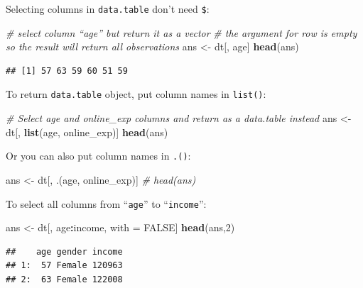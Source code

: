\documentclass[12pt,]{krantz}
\makeatletter
\newenvironment{Shaded}{\begin{snugshade}}{\end{snugshade}}
\newcommand{\CommentTok}[1]{\textcolor[rgb]{0.37,0.37,0.37}{\textit{#1}}}
\newcommand{\DecValTok}[1]{\textcolor[rgb]{0.06,0.06,0.06}{#1}}
\newcommand{\KeywordTok}[1]{\textcolor[rgb]{0.27,0.27,0.27}{\textbf{#1}}}
\newcommand{\NormalTok}[1]{#1}
\newcommand{\OperatorTok}[1]{\textcolor[rgb]{0.43,0.43,0.43}{\textbf{#1}}}
\newcommand{\OtherTok}[1]{\textcolor[rgb]{0.37,0.37,0.37}{#1}}
\newcommand{\StringTok}[1]{\textcolor[rgb]{0.5,0.5,0.5}{#1}}
\newenvironment{kframe}{%
\medskip{}
\setlength{\fboxsep}{.8em}
 \def\at@end@of@kframe{}%
 \ifinner\ifhmode%
  \def\at@end@of@kframe{\end{minipage}}%
  \begin{minipage}{\columnwidth}%
 \fi\fi%
 \def\FrameCommand##1{\hskip\@totalleftmargin \hskip-\fboxsep
 \colorbox{shadecolor}{##1}\hskip-\fboxsep
     \hskip-\linewidth \hskip-\@totalleftmargin \hskip\columnwidth}%
 \MakeFramed {\advance\hsize-\width
   \@totalleftmargin\z@ \linewidth\hsize
   \@setminipage}}%
 {\par\unskip\endMakeFramed%
 \at@end@of@kframe}
\renewenvironment{Shaded}{\begin{kframe}}{\end{kframe}}
\makeatother
\begin{document}
Selecting columns in \texttt{data.table} don't need \texttt{\$}:

\begin{Shaded}
\begin{Highlighting}[]
\CommentTok{# select column “age” but return it as a vector}
\CommentTok{# the argument for row is empty so the result will return all observations}
\NormalTok{ans <-}\StringTok{ }\NormalTok{dt[, age]}
\KeywordTok{head}\NormalTok{(ans)}
\end{Highlighting}
\end{Shaded}

\begin{verbatim}
## [1] 57 63 59 60 51 59
\end{verbatim}

To return \texttt{data.table} object, put column names in \texttt{list()}:

\begin{Shaded}
\begin{Highlighting}[]
\CommentTok{# Select age and online_exp columns and return as a data.table instead}
\NormalTok{ans <-}\StringTok{ }\NormalTok{dt[, }\KeywordTok{list}\NormalTok{(age, online_exp)]}
\KeywordTok{head}\NormalTok{(ans)}
\end{Highlighting}
\end{Shaded}

Or you can also put column names in \texttt{.()}:

\begin{Shaded}
\begin{Highlighting}[]
\NormalTok{ans <-}\StringTok{ }\NormalTok{dt[, .(age, online_exp)]}
\CommentTok{# head(ans)}
\end{Highlighting}
\end{Shaded}

To select all columns from ``\texttt{age}'' to ``\texttt{income}'':

\begin{Shaded}
\begin{Highlighting}[]
\NormalTok{ans <-}\StringTok{ }\NormalTok{dt[, age}\OperatorTok{:}\NormalTok{income, with =}\StringTok{ }\OtherTok{FALSE}\NormalTok{]}
\KeywordTok{head}\NormalTok{(ans,}\DecValTok{2}\NormalTok{)}
\end{Highlighting}
\end{Shaded}

\begin{verbatim}
##    age gender income
## 1:  57 Female 120963
## 2:  63 Female 122008
\end{verbatim}
\end{document}
